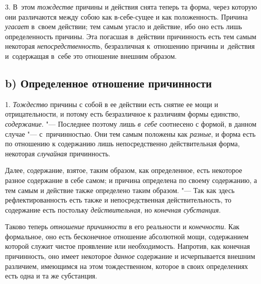 3. В~этом {\em тождестве} причины и действия снята теперь та форма, через
которую они различаются между собою как в-себе-сущее и как положенность.
Причина {\em угасает} в~своем действии; тем самым угасло и действие, ибо оно
есть лишь определенность причины. Эта погасшая в~действии причинность есть тем
самым некоторая {\em непосредственность}, безразличная к~отношению причины
и~действия и~содержащая в~себе это отношение внешним образом.

\subsection%
[b) Определенное отношение причинности]%
{b) Определенное отношение причинности}

1. {\em Тождество} причины с собой в ее действии есть снятие ее мощи и
отрицательности, и потому есть безразличное к различиям формы единство,
{\em содержание}. "--- Последнее поэтому лишь {\em в~себе} соотнесено с формой,
в данном случае "--- с~причинностью. Они тем самым положены как {\em разные}, и
форма есть по отношению к содержанию лишь непосредственно действительная форма,
некоторая {\em случайная} причинность.

Далее, содержание, взятое, таким образом, как определенное, есть некоторое
разное содержание в себе самом; и причина определена по своему содержанию,
а тем самым и действие также определено таким образом. "--- Так как здесь
рефлектированность есть также и непосредственная действительность, то
содержание есть постольку {\em действительная}, но {\em конечная субстанция}.

Таково теперь {\em отношение причинности} в его реальности и {\em конечности}.
Как формальное, оно есть бесконечное отношение абсолютной мощи, содержанием
которой служит чистое проявление или необходимость. Напротив, как конечная
причинность, оно имеет некоторое {\em данное} содержание и исчерпывается
внешним различием, имеющимся на этом тождественном, которое в своих
определениях есть одна и та же субстанция.

